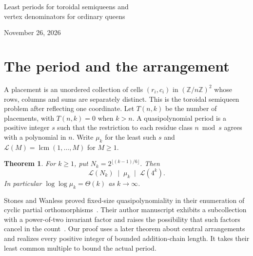 \documentclass[10pt]{article}
\newtheorem{theorem}{Theorem}
\newcommand{\Z}{\mathbb Z}
\newcommand{\lcm}{\operatorname{lcm}}
\newcommand{\LcmTo}[1]{\mathcal L(#1)}
\begin{document}
\begin{center}
{\LARGE Least periods for toroidal semiqueens and\\[2pt]vertex denominators for ordinary queens\par}
\medskip November 26, 2026
\end{center}
\begin{abstract}
Fix the number $k$ of pieces and count nonattacking toroidal semiqueen placements as a function of board order $n$. We prove that the least quasipolynomial period $\mu_k$ satisfies $\log\log\mu_k=\Theta(k)$. An addition chain for $a$ gives a subcollection of attack equations whose integer relation group has torsion $\Z/a\Z$. The no-period-collapse theorem for central arrangements then makes every such $a$ a divisor of the least period. On the ordinary square board we construct $q$-queen vertices of every denominator through $2^{\lfloor(q-1)/2\rfloor}$, an exponential initial interval in a conjecture of Chaiken, Hanusa and Zaslavsky.
\end{abstract}

\section{The period and the arrangement}
A placement is an unordered collection of cells $(r_i,c_i)$ in $(\Z/n\Z)^2$ whose rows, columns and sums are separately distinct. This is the toroidal semiqueen problem after reflecting one coordinate. Let $T(n,k)$ be the number of placements, with $T(n,k)=0$ when $k>n$. A quasipolynomial period is a positive integer $s$ such that the restriction to each residue class $n\bmod s$ agrees with a polynomial in $n$. Write $\mu_k$ for the least such $s$ and $\LcmTo M=\lcm(1,\dots,M)$ for $M\ge1$.

\begin{theorem}\label{thm:growth}
For $k\ge1$, put $N_k=2^{\lfloor (k-1)/6\rfloor}$. Then
\[
  \LcmTo{N_k}\;\mid\;\mu_k\;\mid\;\LcmTo{4^k}.
\]
In particular $\log\log\mu_k=\Theta(k)$ as $k\to\infty$.
\end{theorem}

Stones and Wanless proved fixed-size quasipolynomiality in their enumeration of cyclic partial orthomorphisms~\cite{partial}. Their author manuscript exhibits a subcollection with a power-of-two invariant factor and raises the possibility that such factors cancel in the count~\cite[\S3]{preprint}. Our proof uses a later theorem about central arrangements and realizes every positive integer of bounded addition-chain length. It takes their least common multiple to bound the actual period.
\end{document}
